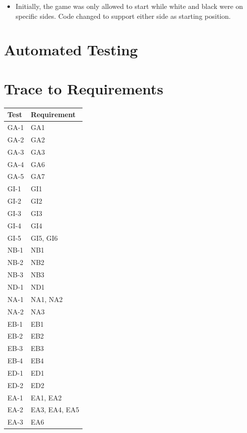 \documentclass[12pt, titlepage]{article}
\begin{document}
\begin{itemize}
  \item Initially, the game was only allowed to start while white and black were on specific sides. Code changed to support either side as starting position.
\end{itemize}
  

\section{Automated Testing}
		
\section{Trace to Requirements}

\begin{longtable}{| p{} | p{} |}
  \hline
  Test & Requirement\\
  \hline
  GA-1 & GA1\\
  \hline
  GA-2 & GA2\\
  \hline
  GA-3 & GA3\\
  \hline
  GA-4 & GA6\\
  \hline
  GA-5 & GA7\\
  \hline
  GI-1 & GI1\\
  \hline
  GI-2 & GI2\\
  \hline
  GI-3 & GI3\\
  \hline
  GI-4 & GI4\\
  \hline
  GI-5 & GI5, GI6\\
  \hline
  NB-1 & NB1\\
  \hline
  NB-2 & NB2\\
  \hline
  NB-3 & NB3\\
  \hline
  ND-1 & ND1\\
  \hline
  NA-1 & NA1, NA2\\
  \hline
  NA-2 & NA3\\
  \hline
  EB-1 & EB1\\
  \hline
  EB-2 & EB2\\
  \hline
  EB-3 & EB3\\
  \hline
  EB-4 & EB4\\
  \hline
  ED-1 & ED1\\
  \hline
  ED-2 & ED2\\
  \hline
  EA-1 & EA1, EA2\\
  \hline
  EA-2 & EA3, EA4, EA5\\
  \hline
  EA-3 & EA6\\

\end{longtable}
\end{document}
